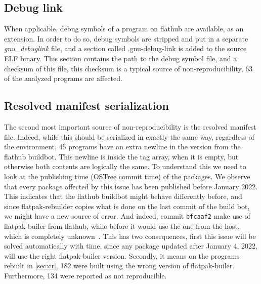 \documentclass[a4paper,11pt,oneside]{report}
\theoremstyle{definition}
\newcommand{\sysname}{flatpak-rebuilder\xspace}
\newcommand{\fh}{flathub\xspace}
\newcommand{\fb}{flatpak-builer\xspace}
\newcommand{\fhbb}{flathub buildbot\xspace}
\newcommand{\ot}{OSTree\xspace}
\begin{document}
\subsection*{Debug link}
When applicable, debug symbols of a program on \fh are available, as an
extension. In order to do so, debug symbols are stripped and put in a separate
\emph{gnu\_debuglink} file, and a section called .gnu-debug-link is added to
the source ELF binary. This section contains the path to the debug symbol file,
and a checksum of this file, this checksum is a typical source of
non-reproducibility, 63 of the analyzed programs are affected.

\subsection*{Resolved manifest serialization}
The second most important source of non-reproducibility is the resolved
manifest file. Indeed, while this should be serialized in exactly the same way,
regardless of the environment, 45 programs have an extra newline in the version
from the \fhbb. This newline is inside the tag array, when it is empty, but
otherwise both contents are logically the same. To understand this we need to
look at the publishing time (\ot commit time) of the packages. We observe
that every package affected by this issue has been published before January
2022. This indicates that the \fhbb might behave differently before, and since
\sysname copies what is done on the last commit of the build bot, we might have
a new source of error. And indeed, commit \verb|bfcaaf2| make use of \fb from
\fh, while before it would use the one from the host, which is completely
unknown~\cite{gh:ptdr}. This has two consequences, first this issue will be
solved automatically with time, since any package updated after January 4, 2022,
will use the right \fb version. Secondly, it means on the programs rebuilt in
\autoref{sec:cr}, 182 were built using the wrong version of \fb. Furthermore,
134 were reported as not reproducible.
\end{document}
